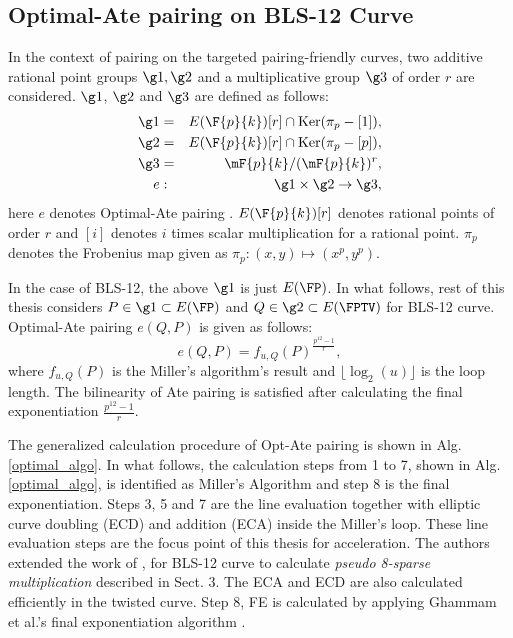 \subsection{Optimal-Ate pairing on BLS-12 Curve}
In the context of pairing on the targeted pairing-friendly curves, two additive rational point groups $\g1, \g2$ and a multiplicative group $\g3$ of order $r$ are considered. 
$\g1$, $\g2$ and $\g3$ are defined as follows:
\begin{eqnarray}\label{eq:g1}
\g1 & = &  E(\F{p}{k}) [r] \cap \text{Ker}(\pi_p - [1]), \nonumber \\
\g2 & = &  E(\F{p}{k}) [r] \cap \text{Ker}(\pi_p - [p]), \nonumber \\
\g3 & = & \mF{p}{k}/(\mF{p}{k})^r, \nonumber \\
 e & : &\g1 \times \g2 \rightarrow \g3,
\end{eqnarray}
here $e$ denotes Optimal-Ate pairing \cite{DBLP:journals/tit/Vercauteren10}. $E(\F{p}{k})[r]$ denotes rational points of order $r$ and $[i]$ denotes $i$ times scalar multiplication for a rational point. 
$\pi_p$ denotes the Frobenius map given as $\pi_p: (x,y) \mapsto (x^p,y^p)$.

In the case of BLS-12, the above $\g1$ is just $E(\FP)$. 
In what follows, rest of this thesis considers $P \in \g1 \subset E(\FP)$ and  $Q \in \g2 \subset  E(\FPTV)$ for BLS-12 curve.
Optimal-Ate pairing $e(Q,P)$ is given as follows:
\begin{equation}
	e(Q,P)=f_{u,Q}(P)^{\frac{p^{12}-1}{r}},
\end{equation}
where $f_{u,Q}(P)$ is the Miller's algorithm's result and $\lfloor \log_2 (u) \rfloor$ is the loop length. The bilinearity of Ate pairing is satisfied after calculating the final exponentiation $\frac{p^{12}-1}{r}$.


The generalized calculation procedure of Opt-Ate pairing is shown in Alg. \ref{optimal_algo}. 
In what follows, the calculation steps from 1 to 7, shown in Alg. \ref{optimal_algo}, is identified as Miller's Algorithm and step 8 is the final exponentiation. Steps 3, 5 and 7 are the line evaluation together with elliptic curve doubling (ECD) and addition (ECA) inside the Miller's loop. These line evaluation steps are the focus point of this thesis for acceleration. 
The authors extended the work of \cite{PAIRING:MANS13},\cite{ICISC:KONSD16} for BLS-12 curve to calculate \textit{pseudo 8-sparse multiplication} described in Sect. 3.
The ECA and ECD are also calculated efficiently in the twisted curve. 
Step 8, FE is calculated by applying Ghammam et al.'s final exponentiation algorithm \cite{EPRINT:GhaFou16a}.

